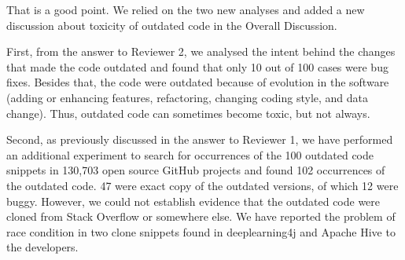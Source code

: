 \documentclass[a4paper,twoside,10pt]{reviewresponse}
\begin{document}

That is a good point. We relied on the two new analyses and added a new discussion about toxicity of outdated code in the Overall Discussion. 

First, from the answer to Reviewer 2, we analysed the intent behind the changes that made the code outdated and found that only 10 out of 100 cases were bug fixes. Besides that, the code were outdated because of evolution in the software (adding or enhancing features, refactoring, changing coding style, and data change). Thus, outdated code can sometimes become toxic, but not always.

Second, as previously discussed in the answer to Reviewer 1, we have performed an additional experiment to search for occurrences of the 100 outdated code snippets in 130,703 open source GitHub projects and found 102 occurrences of the outdated code. 47 were exact copy of the outdated versions, of which 12 were buggy. However, we could not establish evidence that the outdated code were cloned from Stack Overflow or somewhere else. We have reported the problem of race condition in two clone snippets found in deeplearning4j and Apache Hive to the developers.
\end{document}

